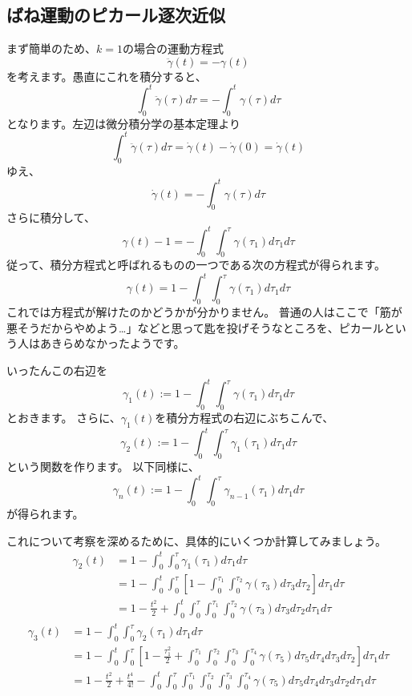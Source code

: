 \subsection{ばね運動のピカール逐次近似}

まず簡単のため、$k=1$の場合の運動方程式
\[
  \ddot{\gamma}(t)=-\gamma(t)
\]
を考えます。愚直にこれを積分すると、
\[
  \int_0^t\ddot{\gamma}(\tau)d\tau=-\int_0^t\gamma(\tau)d\tau
\]
となります。左辺は微分積分学の基本定理より
\[
  \int_0^t\ddot{\gamma}(\tau)d\tau=\dot{\gamma}(t)-\dot\gamma(0)=\dot{\gamma}(t)
\]
ゆえ、
\[
  \dot{\gamma}(t)=-\int_0^t\gamma(\tau)d\tau
\]
さらに積分して、
\[
  \gamma(t)-1=-\int_0^t\int_0^{\tau}\gamma(\tau_1)d\tau_1d\tau
\]
従って、積分方程式と呼ばれるものの一つである次の方程式が得られます。
\[
  \gamma(t)=1-\int_0^t\int_0^{\tau}\gamma(\tau_1)d\tau_1d\tau
\]
これでは方程式が解けたのかどうかが分かりません。
普通の人はここで「筋が悪そうだからやめよう…」などと思って匙を投げそうなところを、ピカールという人はあきらめなかったようです。

いったんこの右辺を
\[
  \gamma_1(t):=1-\int_0^t\int_0^{\tau}\gamma(\tau_1)d\tau_1d\tau
\]
とおきます。
さらに、$\gamma_1(t)$を積分方程式の右辺にぶちこんで、
\[
  \gamma_2(t):=1-\int_0^t\int_0^{\tau}\gamma_1(\tau_1)d\tau_1d\tau
\]
という関数を作ります。
以下同様に、
\[
  \gamma_n(t):=1-\int_0^t\int_0^{\tau}\gamma_{n-1}(\tau_1)d\tau_1d\tau
\]
が得られます。

これについて考察を深めるために、具体的にいくつか計算してみましょう。
\begin{align*}
  \gamma_2(t)&=1-\int_0^t\int_0^{\tau}\gamma_1(\tau_1)d\tau_1d\tau\\
  &=1-\int_0^t\int_0^{\tau}\left[1-\int_0^{\tau_1}\int_0^{\tau_2}\gamma(\tau_3)d\tau_3d\tau_2\right]d\tau_1d\tau\\
  &=1-\frac{t^2}{2}+\int_0^t\int_0^{\tau}\int_0^{\tau_1}\int_0^{\tau_2}\gamma(\tau_3)d\tau_3d\tau_2d\tau_1d\tau
\end{align*}
\begin{align*}
  \gamma_3(t)&=1-\int_0^t\int_0^{\tau}\gamma_2(\tau_1)d\tau_1d\tau\\
  &=1-\int_0^t\int_0^\tau\left[1-\frac{\tau_1^2}{2}+\int_0^{\tau_1}\int_0^{\tau_2}\int_0^{\tau_3}\int_0^{\tau_4}\gamma(\tau_5)d\tau_5d\tau_4d\tau_3d\tau_2\right]d\tau_1d\tau\\
  &=1-\frac{t^2}{2}+\frac{t^4}{4!}-\int_0^t\int_0^\tau\int_0^{\tau_1}\int_0^{\tau_2}\int_0^{\tau_3}\int_0^{\tau_4}\gamma(\tau_5)d\tau_5d\tau_4d\tau_3d\tau_2d\tau_1d\tau
\end{align*}

